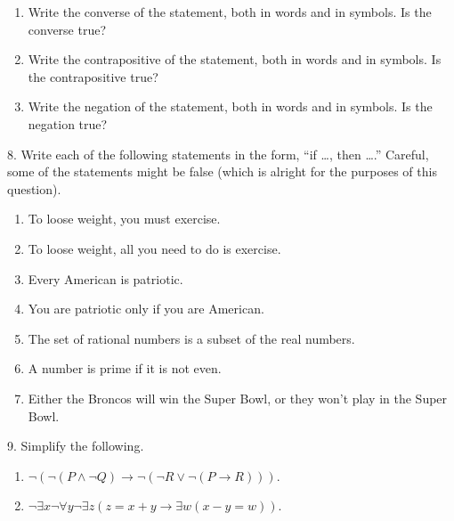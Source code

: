 \documentclass[10pt,]{book}
\theoremstyle{plain}
\theoremstyle{definition}
\theoremstyle{definition}
\theoremstyle{definition}
\numberwithin{equation}{chapter}
\def\imp{\rightarrow}
\begin{document}
\begin{exerciselist}
\begin{enumerate}[label=(\alph*)]
\item\hypertarget{li-1146}{}
                Write the converse of the statement, both in words and in symbols. Is the converse true?
\item\hypertarget{li-1147}{}
                Write the contrapositive of the statement, both in words and in symbols. Is the contrapositive true?
\item\hypertarget{li-1148}{}
                Write the negation of the statement, both in words and in symbols. Is the negation true?
\end{enumerate}
\par\smallskip
\item[8.]\hypertarget{exercise-251}{}
            Write each of the following statements in the form, ``if \dots{}, then \dots{}.'' Careful, some of the statements might be false (which is alright for the purposes of this question).
\leavevmode%
\begin{enumerate}[label=(\alph*)]
\item\hypertarget{li-1153}{}
                To loose weight, you must exercise.
\item\hypertarget{li-1154}{}
                To loose weight, all you need to do is exercise.
\item\hypertarget{li-1155}{}
                Every American is patriotic.
\item\hypertarget{li-1156}{}
                You are patriotic only if you are American.
\item\hypertarget{li-1157}{}
                The set of rational numbers is a subset of the real numbers.
\item\hypertarget{li-1158}{}
                A number is prime if it is not even.
\item\hypertarget{li-1159}{}
                Either the Broncos will win the Super Bowl, or they won't play in the Super Bowl.
\end{enumerate}
\par\smallskip
\item[9.]\hypertarget{exercise-252}{}
            Simplify the following.
\leavevmode%
\begin{enumerate}[label=(\alph*)]
\item\hypertarget{li-1167}{}\(\neg (\neg (P \wedge \neg Q) \imp \neg(\neg R \vee \neg(P \imp R)))\).%
\item\hypertarget{li-1168}{}\(\neg \exists x \neg \forall y \neg \exists z (z = x + y \imp \exists w (x - y = w))\).%

\end{enumerate}
\end{exerciselist}
\end{document}
